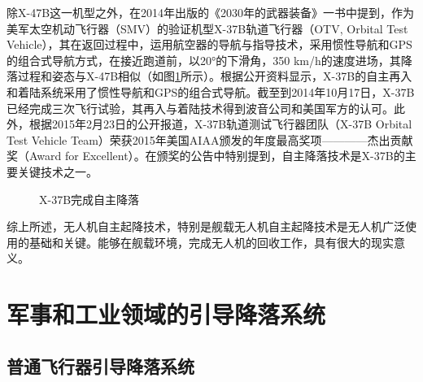 除X-47B这一机型之外，在2014年出版的《2030年的武器装备》\cite{2030equipment}一书中提到，作为美军太空机动飞行器（SMV）的验证机型X-37B轨道飞行器（OTV, Orbital Test Vehicle），其在返回过程中，运用航空器的导航与指导技术，采用惯性导航和GPS的组合式导航方式，在接近跑道前，以20°的下滑角，350 km/h的速度进场，其降落过程和姿态与X-47B相似（如图\ref{fig:31_X37B_Landing}所示）。根据公开资料显示，X-37B的自主再入和着陆系统采用了惯性导航和GPS的组合式导航。截至到2014年10月17日，X-37B已经完成三次飞行试验，其再入与着陆技术得到波音公司和美国军方的认可。此外，根据2015年2月23日的公开报道，X-37B轨道测试飞行器团队（X-37B Orbital Test Vehicle Team）荣获2015年美国AIAA颁发的年度最高奖项————杰出贡献奖（Award for Excellent）\cite{X_37B}。在颁奖的公告中特别提到，自主降落技术是X-37B的主要关键技术之一。

\begin{figure}[htb]
	\centering%
	\hspace{0.7em}%
	\caption{X-37B完成自主降落}
	\label{fig:31_X37B_Landing}
\end{figure}

综上所述，无人机自主起降技术，特别是舰载无人机自主起降技术是无人机广泛使用的基础和关键。能够在舰载环境，完成无人机的回收工作，具有很大的现实意义。


\section{军事和工业领域的引导降落系统}
\subsection{普通飞行器引导降落系统}
